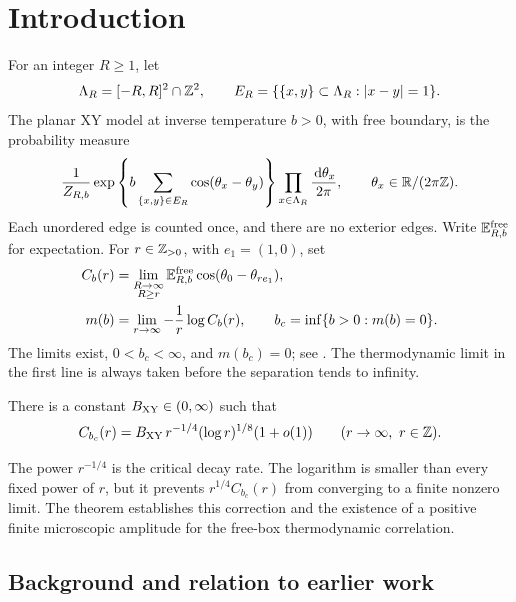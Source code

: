 \section{Introduction}\label{sec:introduction}

For an integer \(R\ge1\), let
\[
 \Lambda_R=[-R,R]^2\cap\mathbb Z^2,\qquad
 E_R=\{\{x,y\}\subset\Lambda_R:\lvert x-y\rvert=1\}.
\]
The planar XY model at inverse temperature \(b>0\), with free boundary,
is the probability measure
\begin{equation}\label{eq:xy-law}
 \frac{1}{Z_{R,b}}
 \exp\left\{b\sum_{\{x,y\}\in E_R}\cos(\theta_x-\theta_y)\right\}
 \prod_{x\in\Lambda_R}\frac{\,\mathrm d\theta_x}{2\pi},
 \qquad \theta_x\in\mathbb R/(2\pi\mathbb Z).
\end{equation}
Each unordered edge is counted once, and there are no exterior edges.
Write \(\mathbb E^{\rm free}_{R,b}\) for expectation.  For \(r\in\mathbb Z_{>0}\), with
\(e_1=(1,0)\), set
\begin{equation}\label{eq:critical-definition}
 \begin{split}
 C_b(r)&=\lim_{\substack{R\to\infty\\R\ge r}}
       \mathbb E^{\rm free}_{R,b}\cos(\theta_0-\theta_{re_1}),\\
 m(b)&=\lim_{r\to\infty}-\frac1r\log C_b(r),\qquad
 b_c=\inf\{b>0:m(b)=0\}.
 \end{split}
\end{equation}
The limits exist, \(0<b_c<\infty\), and \(m(b_c)=0\); see
\cite[Section~1.1 and Proposition~1.2]{C}.  The thermodynamic limit in the
first line is always taken before the separation tends to infinity.

\begin{theorem}\label{thm:main}
There is a constant \(B_{\rm XY}\in(0,\infty)\) such that
\[
 C_{b_c}(r)
 =B_{\rm XY}\,r^{-1/4}(\log r)^{1/8}(1+o(1))
 \qquad(r\to\infty,\ r\in\mathbb Z).
\]
\end{theorem}

The power \(r^{-1/4}\) is the critical decay rate.  The logarithm is
smaller than every fixed power of \(r\), but it prevents
\(r^{1/4}C_{b_c}(r)\) from converging to a finite nonzero limit.  The
theorem establishes this correction and the existence of a positive
finite microscopic amplitude for the free-box thermodynamic correlation.

\subsection{Background and relation to earlier work}

